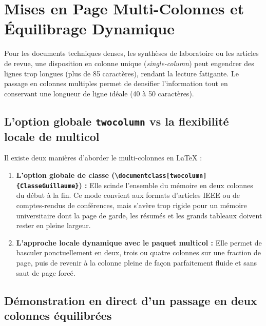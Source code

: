 \section{Mises en Page Multi-Colonnes et Équilibrage Dynamique}
\label{sec:multi_colonnes}

Pour les documents techniques denses, les synthèses de laboratoire ou les articles de revue, une disposition en colonne unique (\emph{single-column}) peut engendrer des lignes trop longues (plus de 85 caractères), rendant la lecture fatigante.
Le passage en colonnes multiples permet de densifier l'information tout en conservant une longueur de ligne idéale (40 à 50 caractères).

\subsection{L'option globale \texttt{twocolumn} vs la flexibilité locale de \textsf{multicol}}
\label{subsec:comparatif_colonnes}

Il existe deux manières d'aborder le multi-colonnes en \LaTeX{} :
\begin{enumerate}
  \item \textbf{L'option globale de classe (\texttt{\textbackslash documentclass[twocolumn]\{ClasseGuillaume\}}) :}
  Elle scinde l'ensemble du mémoire en deux colonnes du début à la fin.
  Ce mode convient aux formats d'articles IEEE ou de comptes-rendus de conférences, mais s'avère trop rigide pour un mémoire universitaire dont la page de garde, les résumés et les grands tableaux doivent rester en pleine largeur.
  
  \item \textbf{L'approche locale dynamique avec le paquet \textsf{multicol} :}
  Elle permet de basculer ponctuellement en deux, trois ou quatre colonnes sur une fraction de page, puis de revenir à la colonne pleine de façon parfaitement fluide et sans saut de page forcé.
\end{enumerate}

\subsection{Démonstration en direct d'un passage en deux colonnes équilibrées}
\label{subsec:demo_deux_colonnes}

